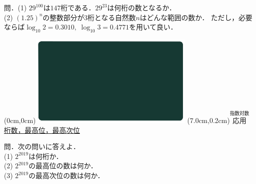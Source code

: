 \documentclass[10pt,
fleqn,
dvipdfmx,
uplatex
]{jsarticle}
\begin{document}
\normalsize 
問．(1)  ${29}^{100}$は${147}$桁である．${29}^{23}$は何桁の数となるか．\\
(2)  $\left(1.{25}\right)^n$の整数部分が$3$桁となる自然数$n$はどんな範囲の数か．
ただし，必要ならば$\log _{10}2=0.{3010},\;\log _{10}3=0.{4771}$を用いて良い．\\



\newpage



\at(0cm,0cm){\includegraphics[width=8cm,bb=0 0 1920 1080]{./youtube/thumbnails/templates/smart_background/指数対数.jpeg}}
\at(7.0cm,0.2cm){\small\color{bradorange}$\overset{\text{指数対数}}{\text{応用}}$}
{\color{orange}\LARGE\underline{桁数，最高位，最高次位}}\vspace{0.3zw}

\large 
問．次の問いに答えよ．\\
(1)  $2^{{2019}}$は何桁か．\\
(2)  $2^{{2019}}$の最高位の数は何か．\\
(3)  $2^{{2019}}$の最高次位の数は何か．\\
\end{document}
